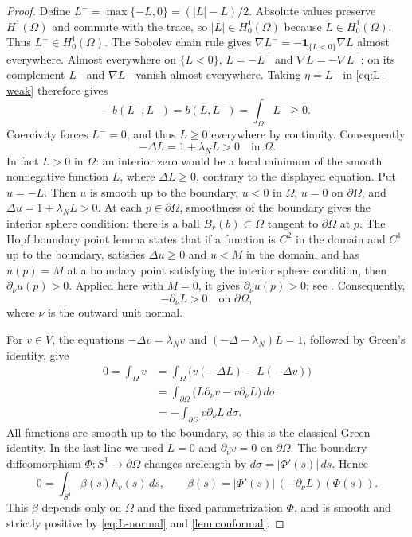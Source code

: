 \begin{proof}
Define $L^-=\max\{-L,0\}=(|L|-L)/2$. Absolute values preserve
$H^1(\Omega)$ and commute with the trace, so $|L|\in H_0^1(\Omega)$
because $L\in H_0^1(\Omega)$. Thus $L^-\in H_0^1(\Omega)$.
The Sobolev chain rule gives
$\nabla L^-=-\mathbf1_{\{L<0\}}\nabla L$ almost everywhere.
Almost everywhere on $\{L<0\}$,
$L=-L^-$ and $\nabla L=-\nabla L^-$; on its complement $L^-$ and
$\nabla L^-$ vanish almost everywhere. Taking $\eta=L^-$ in
\cref{eq:L-weak} therefore gives
\[
 -b(L^-,L^-)=b(L,L^-)=\int_\Omega L^-\ge0.
\]
Coercivity forces $L^-=0$, and thus $L\ge0$ everywhere by continuity.
Consequently
\[
 -\Delta L=1+\lambda_NL>0\quad\text{in }\Omega.
\]
In fact $L>0$ in $\Omega$: an interior zero would be a local minimum
of the smooth nonnegative function $L$, where $\Delta L\ge0$, contrary
to the displayed equation. Put $u=-L$. Then $u$ is smooth up to the
boundary, $u<0$ in $\Omega$, $u=0$ on $\partial\Omega$, and
$\Delta u=1+\lambda_NL>0$. At each $p\in\partial\Omega$, smoothness
of the boundary gives the interior sphere condition: there is a ball
$B_r(b)\subset\Omega$ tangent to $\partial\Omega$ at $p$.
The Hopf boundary point lemma states that if a function is $C^2$ in
the domain and $C^1$ up to the boundary, satisfies $\Delta u\ge0$ and
$u<M$ in the domain, and has $u(p)=M$ at a boundary point satisfying
the interior sphere condition, then $\partial_\nu u(p)>0$.
Applied here with $M=0$,
it gives $\partial_\nu u(p)>0$; see
\cite[Lemma 2.21, p.~29]{Hunter}. Consequently,
\begin{equation}\label{eq:L-normal}
 -\partial_\nu L>0\quad\text{on }\partial\Omega,
\end{equation}
where $\nu$ is the outward unit normal.

For $v\in V$, the equations $-\Delta v=\lambda_Nv$ and
$(-\Delta-\lambda_N)L=1$, followed by Green's identity, give
\[
 \begin{aligned}
 0=\int_\Omega v
 &=\int_\Omega\bigl(v(-\Delta L)-L(-\Delta v)\bigr)\\
 &=\int_{\partial\Omega}
       \bigl(L\partial_\nu v-v\partial_\nu L\bigr)\,d\sigma\\
 &=-\int_{\partial\Omega}v\partial_\nu L\,d\sigma.
 \end{aligned}
\]
All functions are smooth up to the boundary, so this is the classical
Green identity. In the last line we used $L=0$ and
$\partial_\nu v=0$ on $\partial\Omega$.
The boundary diffeomorphism $\Phi:S^1\to\partial\Omega$ changes
arclength by $d\sigma=|\Phi'(s)|\,ds$. Hence
\[
 0=\int_{S^1}\beta(s)h_v(s)\,ds,
 \qquad
 \beta(s)=|\Phi'(s)|\,(-\partial_\nu L)(\Phi(s)).
\]
This $\beta$ depends only on $\Omega$ and the fixed parametrization
$\Phi$, and is smooth and strictly positive by
\cref{eq:L-normal} and \cref{lem:conformal}.


\end{proof}

